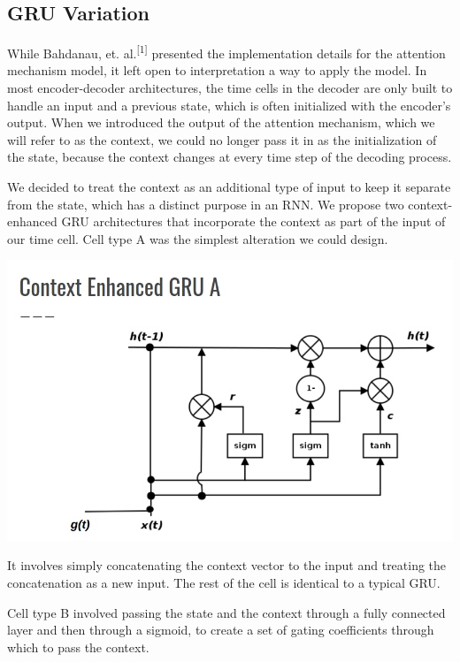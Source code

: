\documentclass[letterpaper, 11pt]{article}
\begin{document}
\begin{multicols}{2}
\subsection{GRU Variation}
While Bahdanau, et. al.\textsuperscript{[1]} presented the implementation details for the attention
mechanism model, it left open to interpretation a way to apply the model.
In most encoder-decoder architectures, the time cells in the decoder are only built to handle an
input and a previous state, which is often initialized with the encoder’s output.
When we introduced the output of the attention mechanism, which we will refer to as the context,
we could no longer pass it in as the initialization of the state, because the context changes at
every time step of the decoding process.

We decided to treat the context as an additional type of input to keep it separate from the state,
which has a distinct purpose in an RNN.
We propose two context-enhanced GRU architectures that incorporate the context as part of the input
of our time cell.
Cell type A was the simplest alteration we could design.

\begin{center}
\includegraphics[scale=.2]{context-gru-a}
\end{center}

\noindent It involves simply concatenating the context vector to the input and treating the
concatenation as a new input.
The rest of the cell is identical to a typical GRU.

Cell type B involved passing the state and the context through a fully connected layer and then
through a sigmoid, to create a set of gating coefficients through which to pass the context.


\end{multicols}
\end{document}
